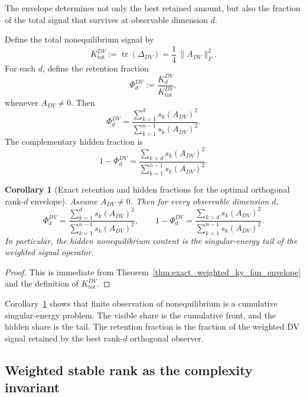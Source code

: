 \documentclass[11pt,a4paper]{article}
\numberwithin{equation}{section}
\theoremstyle{thmcompact}
\newtheorem{corollary}[theorem]{Corollary}
\theoremstyle{remark}
\begin{document}
The envelope determines not only the best retained amount, but also the fraction of the total signal that survives at observable dimension \(d\).

Define the total nonequilibrium signal by
\begin{equation}
K_{\mathrm{tot}}^{DV}
:=
\operatorname{tr}(\Delta_{DV})
=
\frac14\,\|A_{DV}\|_F^2.
\end{equation}
For each \(d\), define the retention fraction
\begin{equation}
\Phi_d^{DV}
:=
\frac{K_d^{DV}}{K_{\mathrm{tot}}^{DV}},
\end{equation}
whenever \(A_{DV}\neq 0\). Then
\begin{equation}
\Phi_d^{DV}
=
\frac{\sum_{k=1}^{d}s_k(A_{DV})^2}{\sum_{k=1}^{n-1}s_k(A_{DV})^2}.
\end{equation}
The complementary hidden fraction is
\begin{equation}
1-\Phi_d^{DV}
=
\frac{\sum_{k>d}s_k(A_{DV})^2}{\sum_{k=1}^{n-1}s_k(A_{DV})^2}.
\end{equation}

\begin{corollary}[Exact retention and hidden fractions for the optimal orthogonal rank-\(d\) envelope]
\label{cor:exact_retention_hidden_fractions}
Assume \(A_{DV}\neq 0\). Then for every observable dimension \(d\),
\begin{equation}
\Phi_d^{DV}
=
\frac{\sum_{k=1}^{d}s_k(A_{DV})^2}{\sum_{k=1}^{n-1}s_k(A_{DV})^2},
\qquad
1-\Phi_d^{DV}
=
\frac{\sum_{k>d}s_k(A_{DV})^2}{\sum_{k=1}^{n-1}s_k(A_{DV})^2}.
\end{equation}
In particular, the hidden nonequilibrium content is the singular-energy tail of the weighted signal operator.
\end{corollary}

\begin{proof}
This is immediate from Theorem~\ref{thm:exact_weighted_ky_fan_envelope} and the definition of \(K_{\mathrm{tot}}^{DV}\).
\end{proof}

Corollary~\ref{cor:exact_retention_hidden_fractions} shows that finite observation of nonequilibrium is a cumulative singular-energy problem. The visible share is the cumulative front, and the hidden share is the tail. The retention fraction is the fraction of the weighted DV signal retained by the best rank-\(d\) orthogonal observer.

\subsection{Weighted stable rank as the complexity invariant}
\end{document}
